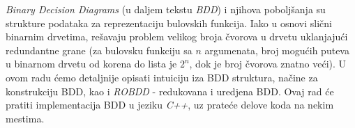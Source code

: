 \emph{Binary Decision Diagrams} (u daljem tekstu \emph{BDD}) i njihova pobolj\v{s}anja su strukture podataka za reprezentaciju bulovskih funkcija. Iako u osnovi sli\v{c}ni binarnim drvetima, re\v{s}avaju problem velikog broja \v{c}vorova u drvetu uklanjaju\'c{}i redundantne grane (za bulovsku funkciju sa $n$ argumenata, broj mogu\'c{}ih puteva u binarnom drvetu od korena do lista je $2^{n}$, dok je broj \v{c}vorova znatno ve\'c{}i). U ovom radu \'c{}emo detaljnije opisati intuiciju iza BDD struktura, na\v{c}ine za konstrukciju BDD, kao i \emph{ROBDD} - redukovana i uredjena BDD. Ovaj rad \'c{}e pratiti implementacija BDD u jeziku \emph{C++}, uz prate\'c{}e delove koda na nekim mestima.

\cite{BDD}

